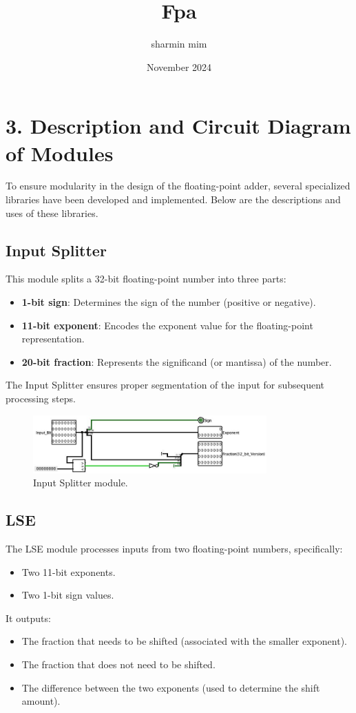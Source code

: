 \documentclass{article}
\title{Fpa}
\author{sharmin mim}
\date{November 2024}
\begin{document}
\section*{3. Description and Circuit Diagram of Modules}

To ensure modularity in the design of the floating-point adder, several specialized libraries have been developed and implemented. Below are the descriptions and uses of these libraries.

\subsection*{Input Splitter}
This module splits a 32-bit floating-point number into three parts:
\begin{itemize}
    \item \textbf{1-bit sign}: Determines the sign of the number (positive or negative).
    \item \textbf{11-bit exponent}: Encodes the exponent value for the floating-point representation.
    \item \textbf{20-bit fraction}: Represents the significand (or mantissa) of the number.
\end{itemize}
The Input Splitter ensures proper segmentation of the input for subsequent processing steps.

\begin{figure}[h!]
\centering
\includegraphics[width=0.8\textwidth]{Input_splitter.jpg} %
\caption{Input Splitter module.}
\label{fig:input_splitter}
\end{figure}

\subsection*{LSE}
The LSE module processes inputs from two floating-point numbers, specifically:
\begin{itemize}
    \item Two 11-bit exponents.
    \item Two 1-bit sign values.
\end{itemize}
It outputs:
\begin{itemize}
    \item The fraction that needs to be shifted (associated with the smaller exponent).
    \item The fraction that does not need to be shifted.
    \item The difference between the two exponents (used to determine the shift amount).
\end{itemize}
\end{document}

